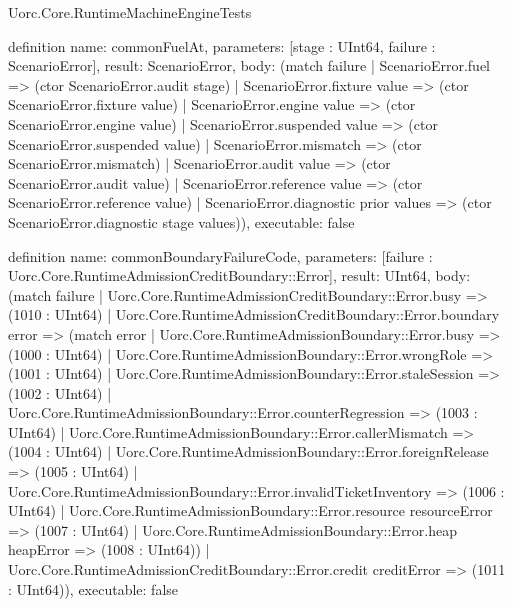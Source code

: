 \begin{lexlean}{Uorc.Core.RuntimeMachineEngineTests}
\begin{semanticmodule}
definition{
  name: commonFuelAt,
  parameters: [stage : UInt64, failure : ScenarioError],
  result: ScenarioError,
  body: (match failure
    | ScenarioError.fuel => (ctor ScenarioError.audit stage)
    | ScenarioError.fixture value => (ctor ScenarioError.fixture value)
    | ScenarioError.engine value => (ctor ScenarioError.engine value)
    | ScenarioError.suspended value => (ctor ScenarioError.suspended value)
    | ScenarioError.mismatch => (ctor ScenarioError.mismatch)
    | ScenarioError.audit value => (ctor ScenarioError.audit value)
    | ScenarioError.reference value => (ctor ScenarioError.reference value)
    | ScenarioError.diagnostic prior values => (ctor ScenarioError.diagnostic stage values)),
  executable: false
}

definition{
  name: commonBoundaryFailureCode,
  parameters: [failure : Uorc.Core.RuntimeAdmissionCreditBoundary::Error],
  result: UInt64,
  body: (match failure
    | Uorc.Core.RuntimeAdmissionCreditBoundary::Error.busy => (1010 : UInt64)
    | Uorc.Core.RuntimeAdmissionCreditBoundary::Error.boundary error => (match error
      | Uorc.Core.RuntimeAdmissionBoundary::Error.busy => (1000 : UInt64)
      | Uorc.Core.RuntimeAdmissionBoundary::Error.wrongRole => (1001 : UInt64)
      | Uorc.Core.RuntimeAdmissionBoundary::Error.staleSession => (1002 : UInt64)
      | Uorc.Core.RuntimeAdmissionBoundary::Error.counterRegression => (1003 : UInt64)
      | Uorc.Core.RuntimeAdmissionBoundary::Error.callerMismatch => (1004 : UInt64)
      | Uorc.Core.RuntimeAdmissionBoundary::Error.foreignRelease => (1005 : UInt64)
      | Uorc.Core.RuntimeAdmissionBoundary::Error.invalidTicketInventory => (1006 : UInt64)
      | Uorc.Core.RuntimeAdmissionBoundary::Error.resource resourceError => (1007 : UInt64)
      | Uorc.Core.RuntimeAdmissionBoundary::Error.heap heapError => (1008 : UInt64))
    | Uorc.Core.RuntimeAdmissionCreditBoundary::Error.credit creditError => (1011 : UInt64)),
  executable: false
}


\end{semanticmodule}
\end{lexlean}
